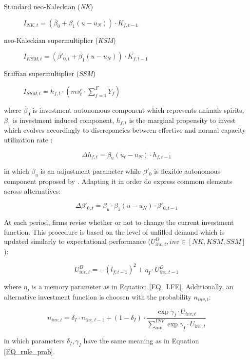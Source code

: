 \documentclass{SelfArx}
\begin{document}
\begin{description}
\item[{Standard neo-Kaleckian  (\emph{NK})}] \(I_{NK,t} = \left(\overline{\beta}_{0} + \beta_{1}(u - u_{N})\right)\cdot K_{f,t-1}\)
\item[{neo-Kaleckian supermultiplier (\emph{KSM})}] \(I_{KSM,t} = \left(\beta'_{0,t} + \beta_{1}(u - u_{N})\right)\cdot K_{f,t-1}\)
\item[{Sraffian supermultiplier (\emph{SSM})}] \(I_{SSM,t} = h_{f,t}\cdot \left(ms^{e}_{t}\cdot \sum_{f=1}^{F}Y_{f}\right)\)
\end{description}
where \(\overline{\beta}_{0}\) is investment autonomous component which represents animals spirits, \(\beta_{1}\) is investment induced component, \(h_{f,t}\) is the marginal propensity to invest which evolves accordingly to discrepancies between effective and normal capacity utilization rate \cite{serrano_1995_Long,serrano_2017_Sraffianc}:
\begin{latex}
\begin{equation}
\Delta h_{f,t} = \beta_{u}(u_{t} - u_{N})\cdot h_{f,t-1}
\end{equation}
\end{latex}
in which \(\beta_{u}\) is an adjustment parameter while \(\beta'_{0}\) is flexible autonomous component proposed by \textcite{allain_2015_Tacklinga}.
Adapting it in order do express commom elements across alternatives:
\begin{latex}
\begin{equation}
\Delta \beta'_{0,t} = \beta_{u}\cdot\beta_{1}(u - u_{N})\cdot \beta'_{0,t-1}
\end{equation}
\end{latex}


At each period, firms revise whether or not to change the current investment function.
This procedure is based on the level of unfilled demand which is updated similarly to expectational performance (\(U^{D}_{inv,t}, inv \in [NK, KSM, SSM]\)):
\begin{latex}
\begin{equation}
U^{D}_{inv,t} = - (l_{f,t-1})^{2} + \eta_{I}\cdot U^{D}_{inv,t-1}
\end{equation}
\end{latex}
where \(\eta_{I}\) is a memory parameter as in Equation \ref{EQ_LFE}.
Additionally, an alternative investment function is choosen with the probability \(n_{inv,t}\):


\begin{latex}
\begin{equation}
\label{Ch_super_EQ_inv_prob}
n_{inv,t} = \delta_{I}\cdot n_{inv,t-1} + (1-\delta_{I})\cdot \frac{\exp{\gamma_{I}\cdot U_{inv,t}}}{\sum_{inv}^{INV}\exp{\gamma_{I}\cdot U_{inv,t}}}
\end{equation}
\end{latex}
in which parameters \(\delta_{I}, \gamma_{I}\) have the same meaning as in Equation \ref{EQ_rule_prob}.
\end{document}
